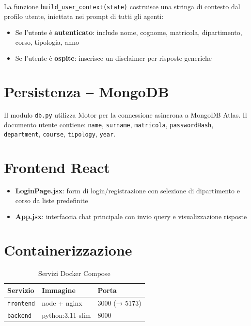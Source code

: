 \documentclass[a4paper,12pt]{report}
\begin{document}
La funzione \texttt{build\_user\_context(state)} costruisce una stringa di contesto dal profilo utente, iniettata nei prompt di tutti gli agenti:

\begin{itemize}
    \item Se l'utente è \textbf{autenticato}: include nome, cognome, matricola, dipartimento, corso, tipologia, anno
    \item Se l'utente è \textbf{ospite}: inserisce un disclaimer per risposte generiche
\end{itemize}

\section{Persistenza -- MongoDB}

Il modulo \texttt{db.py} utilizza Motor per la connessione asincrona a MongoDB Atlas. Il documento utente contiene: \texttt{name}, \texttt{surname}, \texttt{matricola}, \texttt{passwordHash}, \texttt{department}, \texttt{course}, \texttt{tipology}, \texttt{year}.

\section{Frontend React}

\begin{itemize}
    \item \textbf{LoginPage.jsx}: form di login/registrazione con selezione di dipartimento e corso da liste predefinite
    \item \textbf{App.jsx}: interfaccia chat principale con invio query e visualizzazione risposte
\end{itemize}

\section{Containerizzazione}

\begin{table}[H]
\centering
\begin{tabularx}{\textwidth}{l l l}
\toprule
\textbf{Servizio} & \textbf{Immagine} & \textbf{Porta} \\
\midrule
\texttt{frontend} & node + nginx & 3000 (→ 5173) \\
\texttt{backend} & python:3.11-slim & 8000 \\
\bottomrule
\end{tabularx}
\caption{Servizi Docker Compose}
\end{table}
\end{document}
